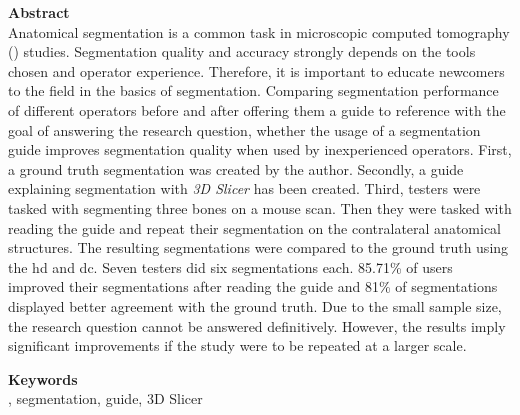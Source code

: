 
\newcommand*{\AbstractHead}[1]{%
	{\noindent\sffamily\Large\textbf{#1}}
	\vspace{10pt}\\
}%

\newcommand*{\SomeSpace}{%
	\vspace{\baselineskip}
}

\AbstractHead{Abstract}
\noindent
\normalsize
Anatomical segmentation is a common task in microscopic computed tomography (\mct) studies. Segmentation quality and accuracy strongly depends on the tools chosen and operator experience. Therefore, it is important to educate newcomers to the field in the basics of \mct\space segmentation. %
Comparing segmentation performance of different operators before and after offering them a guide to reference with the goal of answering the research question, whether the usage of a segmentation guide improves segmentation quality when used by inexperienced operators. %
First, a ground truth segmentation was created by the author. Secondly, a guide explaining \mct\space segmentation with \textit{3D Slicer} has been created. Third, testers were tasked with segmenting three bones on a mouse \mct\space scan. Then they were tasked with reading the guide and repeat their segmentation on the contralateral anatomical structures. The resulting segmentations were compared to the ground truth using the \acrfull{hd} and \acrfull{dc}. %
Seven testers did six segmentations each. 85.71\% of users improved their segmentations after reading the guide and 81\% of segmentations displayed better agreement with the ground truth. %
Due to the small sample size, the research question cannot be answered definitively. However, the results imply significant improvements if the study were to be repeated at a larger scale. \\
\SomeSpace
\newline
\noindent
\AbstractHead{Keywords}
\normalsize
\noindent
\mct, segmentation, guide, 3D Slicer

\glsresetall{}
\SomeSpace
